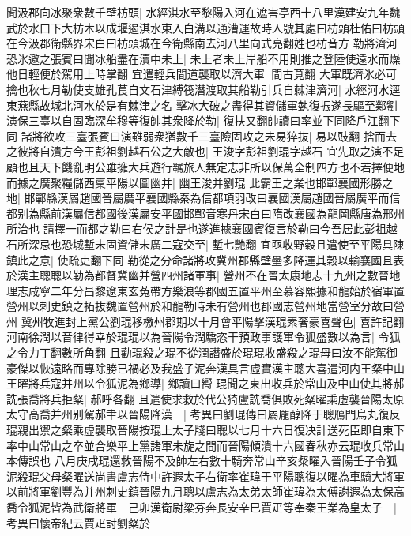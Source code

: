 聞汲郡向冰聚衆數千壁枋頭|{
	水經淇水至黎陽入河在遮害亭西十八里漢建安九年魏武於水口下大枋木以成堰遏淇水東入白溝以通漕運故時人號其處曰枋頭杜佑曰枋頭在今汲郡衛縣界宋白曰枋頭城在今衛縣南去河八里向式亮翻姓也枋音方}
勒將濟河恐氷邀之張賓曰聞冰船盡在瀆中未上|{
	未上者未上岸船不用則推之登陸使遠水而燥他日輕便於駕用上時掌翻}
宜遣輕兵間道襲取以濟大軍|{
	間古莧翻}
大軍既濟氷必可擒也秋七月勒使支雄孔萇自文石津縛筏潛渡取其船勒引兵自棘津濟河|{
	水經河水逕東燕縣故城北河水於是有棘津之名}
擊冰大破之盡得其資儲軍埶復振遂長驅至鄴劉演保三臺以自固臨深牟穆等復帥其衆降於勒|{
	復扶又翻帥讀曰率並下同降戶江翻下同}
諸將欲攻三臺張賓曰演雖弱衆猶數千三臺險固攻之未易猝抜|{
	易以豉翻}
捨而去之彼將自潰方今王彭祖劉越石公之大敵也|{
	王浚字彭祖劉琨字越石}
宜先取之演不足顧也且天下饑亂明公雖擁大兵遊行羈旅人無定志非所以保萬全制四方也不若擇便地而據之廣聚糧儲西稟平陽以圖幽并|{
	幽王浚并劉琨}
此霸王之業也邯鄲襄國形勝之地|{
	邯鄲縣漢屬趙國晉屬廣平襄國縣秦為信都項羽改曰襄國漢屬趙國晉屬廣平而信都别為縣前漢屬信都國後漢屬安平國邯鄲音寒丹宋白曰隋改襄國為龍岡縣唐為邢州所治也}
請擇一而都之勒曰右侯之計是也遂進據襄國賓復言於勒曰今吾居此彭祖越石所深忌也恐城塹未固資儲未廣二寇交至|{
	塹七艷翻}
宜亟收野穀且遣使至平陽具陳鎮此之意|{
	使疏吏翻下同}
勒從之分命諸將攻冀州郡縣壁壘多降運其穀以輸襄國且表於漢主聰聰以勒為都督冀幽并營四州諸軍事|{
	營州不在晉太康地志十九州之數晉地理志咸寧二年分昌黎遼東玄菟帶方樂浪等郡國五置平州至慕容熙據和龍始於宿軍置營州以刺史鎮之拓抜魏置營州於和龍勒時未有營州也郡國志營州地當營室分故曰營州}
冀州牧進封上黨公劉琨移檄州郡期以十月會平陽擊漢琨素奢豪喜聲色|{
	喜許記翻}
河南徐潤以音律得幸於琨琨以為晉陽令潤驕恣干預政事護軍令狐盛數以為言|{
	令狐之令力丁翻數所角翻}
且勸琨殺之琨不從潤譖盛於琨琨收盛殺之琨母曰汝不能駕御豪傑以恢遠略而專除勝已禍必及我盛子泥奔漢具言虛實漢主聰大喜遣河内王粲中山王曜將兵寇并州以令狐泥為鄉導|{
	鄉讀曰嚮}
琨聞之東出收兵於常山及中山使其將郝詵張喬將兵拒粲|{
	郝呼各翻}
且遣使求救於代公猗盧詵喬俱敗死粲曜乘虛襲晉陽太原太守高喬并州别駕郝聿以晉陽降漢　|{
	考異曰劉琨傳曰屬龎醇降于聰鴈門烏丸復反琨親出禦之粲乘虚襲取晉陽按琨上太子牋曰聰以七月十六日復决計送死臣即自東下率中山常山之卒並合樂平上黨諸軍未旋之間而晉陽傾潰十六國春秋亦云琨收兵常山本傳誤也}
八月庚戌琨還救晉陽不及帥左右數十騎奔常山辛亥粲曜入晉陽壬子令狐泥殺琨父母粲曜送尚書盧志侍中許遐太子右衛率崔瑋于平陽聰復以曜為車騎大將軍以前將軍劉豐為并州刺史鎮晉陽九月聰以盧志為太弟太師崔瑋為太傅謝遐為太保高喬令狐泥皆為武衛將軍　己卯漢衛尉梁芬奔長安辛巳賈疋等奉秦王業為皇太子　|{
	考異曰懷帝紀云賈疋討劉粲於}


